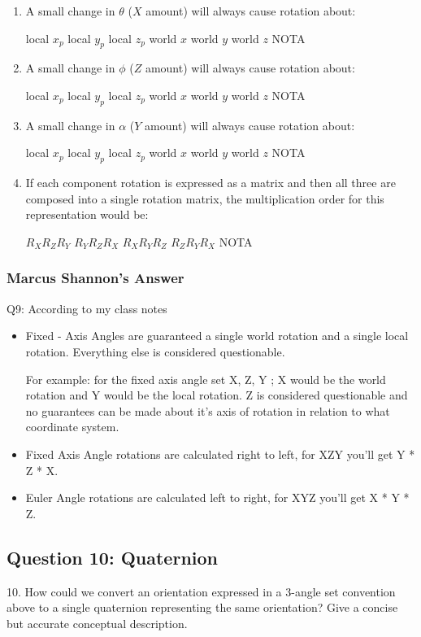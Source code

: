 \documentclass[11pt]{article}
\begin{document}
\begin{spacing}{1.2}
\begin{enumerate}[label=\arabic*)]
	\item A small change in $\theta$ ($X$ amount) will always cause rotation about:
	
	local $x_p$ \qquad local $y_p$ \qquad local $z_p$ \qquad world $x$ \qquad world $y$ \qquad world $z$ \qquad NOTA
	\item A small change in $\phi$ ($Z$ amount) will always cause rotation about:
	
	local $x_p$ \qquad local $y_p$ \qquad local $z_p$ \qquad world $x$ \qquad world $y$ \qquad world $z$ \qquad NOTA
	
	\item A small change in $\alpha$ ($Y$ amount) will always cause rotation about:
	
	local $x_p$ \qquad local $y_p$ \qquad local $z_p$ \qquad world $x$ \qquad world $y$ \qquad world $z$ \qquad NOTA
	\item If each component rotation is expressed as a matrix and then all three are composed into a single rotation matrix, the multiplication order for this representation would be:
	
	$R_XR_ZR_Y$ \qquad
	$R_YR_ZR_X$ \qquad
	$R_XR_YR_Z$ \qquad
	$R_ZR_YR_X$ \qquad
	NOTA
\end{enumerate}


\subsubsection{Marcus Shannon's Answer}
Q9: According to my class notes

\begin{itemize}
	\item Fixed - Axis Angles are guaranteed a single world rotation and a single local rotation. Everything else is considered questionable.

      For example: for the fixed axis angle set X, Z, Y ; X would be the world rotation and Y would be the local rotation. Z is considered questionable and no guarantees can be made about it's axis of rotation in relation to what coordinate system.
    \item Fixed Axis Angle rotations are calculated right to left, for XZY you'll get Y * Z * X.
    \item Euler Angle rotations are calculated left to right, for XYZ you'll get X * Y * Z.
\end{itemize}

\subsection{Question 10:  Quaternion}
10.  How could we convert an orientation expressed in a 3-angle set convention above to a single quaternion representing the same orientation?  Give a concise but accurate conceptual description.


\end{spacing}
\end{document}

